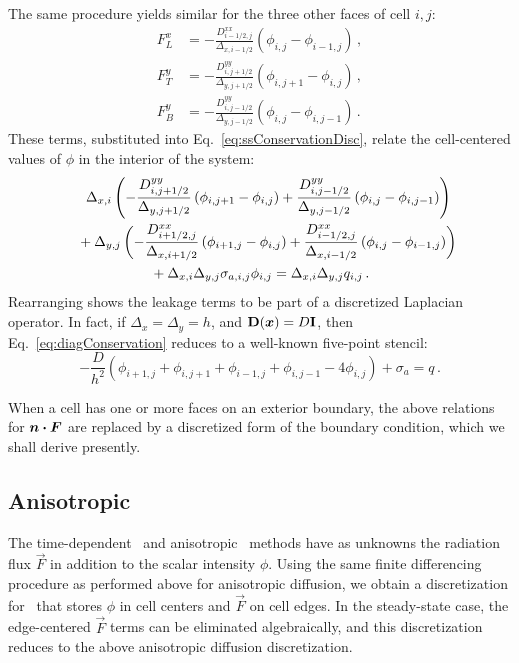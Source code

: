 The same procedure yields similar for the three other faces of cell $i,j$:
\begin{align*}
  F_L^x &= -\frac{D^{xx}_{i-1/2,j}}{\Delta_{x,i-1/2}}
  \left( \phi_{i,j} - \phi_{i-1,j} \right)\,,
  \\
  F_T^y &= -\frac{D^{yy}_{i,j+1/2}}{\Delta_{y,j+1/2}}
  \left( \phi_{i,j+1} - \phi_{i,j} \right)\,,
  \\
  F_B^y &= -\frac{D^{yy}_{i,j-1/2}}{\Delta_{y,j-1/2}}
  \left( \phi_{i,j} - \phi_{i,j-1} \right)\,.
\end{align*}
These terms, substituted into Eq.~\eqref{eq:ssConservationDisc}, relate the
cell-centered values of $\phi$ in the interior of the system:
\begin{multline} \label{eq:diagConservation}
  \hphantom{ {}+{} }
  \Delta_{x,i} \left(
  - \frac{D^{yy}_{i,j+1/2}}{\Delta_{y,j+1/2}} \left( \phi_{i,j+1} - \phi_{i,j}
    \right)
  + \frac{D^{yy}_{i,j-1/2}}{\Delta_{y,j-1/2}} \left( \phi_{i,j} - \phi_{i,j-1}
    \right)
  \right)
\\
\shoveleft{%
  {}+ \Delta_{y,j} \left(
  - \frac{D^{xx}_{i+1/2,j}}{\Delta_{x,i+1/2}} \left( \phi_{i+1,j} - \phi_{i,j}
    \right)
  + \frac{D^{xx}_{i-1/2,j}}{\Delta_{x,i-1/2}} \left( \phi_{i,j} - \phi_{i-1,j}
    \right)
  \right)
}
\\
{}+ \Delta_{x,i}\Delta_{y,j} \sigma_{a,i,j} \phi_{i,j}
= \Delta_{x,i}\Delta_{y,j} q_{i,j}\,.
\end{multline}
Rearranging shows the leakage terms to be part of a discretized Laplacian
operator. In fact, if $\Delta_x = \Delta_y = h$, and
$\mathbf{D}(\bm{x})=D\mathbf{I}$, then Eq.~\eqref{eq:diagConservation} reduces
to a well-known five-point stencil:
\begin{equation*}
  -\frac{D}{h^2}\left( \phi_{i+1,j} + \phi_{i,j+1} + \phi_{i-1,j}
  + \phi_{i,j-1} - 4\phi_{i,j} \right) + \sigma_{a} = q\,.
\end{equation*}

When a cell has one or more faces on an exterior boundary, the above relations
for $\bm{n}\bm{\cdot} \bm{F}$ are replaced by a discretized form of the boundary
condition, which we shall derive presently.

\subsection{Anisotropic \texorpdfstring{\Pone}{P1}}

The time-dependent \Pone\ and anisotropic \Pone\ methods have as unknowns the
radiation flux $\vec{F}$ in addition to the scalar intensity $\phi$. Using the
same finite differencing procedure as performed above for anisotropic diffusion,
we obtain a discretization for \APone\ that stores $\phi$ in cell centers and
$\vec{F}$ on cell edges.
In the steady-state case, the edge-centered $\vec{F}$ terms can be eliminated
algebraically, and this discretization reduces to the above anisotropic
diffusion discretization.

